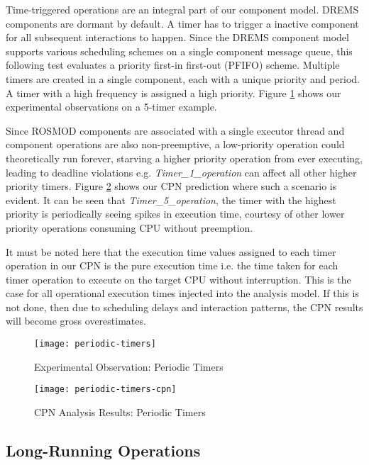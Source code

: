 Time-triggered operations are an integral part of our component model. DREMS components are dormant by default. A timer has to trigger a inactive component for all subsequent interactions to happen. Since the DREMS component model supports various scheduling schemes on a single component message queue, this following test evaluates a priority first-in first-out (PFIFO) scheme. Multiple timers are created in a single component, each with a unique priority and period. A timer with a high frequency is assigned a high priority. Figure \ref{fig:periodic-timers} shows our experimental observations on a 5-timer example. 

Since ROSMOD components are associated with a single executor thread and component operations are also non-preemptive, a low-priority operation could theoretically run forever, starving a higher priority operation from ever executing, leading to deadline violations e.g. \emph{Timer\_1\_operation} can affect all other higher priority timers. Figure \ref{fig:periodic-timers-cpn} shows our CPN prediction where such a scenario is evident. It can be seen that \emph{Timer\_5\_operation}, the timer with the highest priority is periodically seeing spikes in execution time, courtesy of other lower priority operations consuming CPU without preemption.

It must be noted here that the execution time values assigned to each timer operation in our CPN is the pure execution time i.e. the time taken for each timer operation to execute on the target CPU without interruption. This is the case for all operational execution times injected into the analysis model. If this is not done, then due to scheduling delays and interaction patterns, the CPN results will become gross overestimates. 

\begin{figure}[h]
	\centering
	\texttt{[image: periodic-timers]}
	\caption{Experimental Observation: Periodic Timers}
	\label{fig:periodic-timers}
\end{figure}
\FloatBarrier

\begin{figure}[h]
	\centering
	\texttt{[image: periodic-timers-cpn]}
	\caption{CPN Analysis Results: Periodic Timers}
	\label{fig:periodic-timers-cpn}
\end{figure}
\FloatBarrier

\subsection{Long-Running Operations}
\label{sec:long_running_operations}

